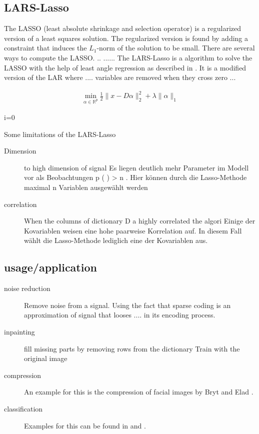 \subsection{LARS-Lasso}
\label{sec:lars}

The LASSO (least absolute shrinkage and selection operator) is a regularized version of a least squares solution.
The regularized version is found by adding a constraint that induces the $L_1$-norm of the solution to be small. \cite{Tibshirani1998}
There are several ways to compute the LASSO. .. ...... \cite{} 
The LARS-Lasso is a algorithm to solve the LASSO with the help of least angle regression
as described in \cite{Efron2004}. It is a modified version of the LAR where .... variables are removed when they cross zero ...


\begin{align}
\min_{\alpha\in\mathbb{R}^{p}}  \frac{1}{2} \lVert x - D\alpha \rVert^{2}_{2} + \lambda \lVert \alpha \rVert_{1}
\end{align}

\begin{algorithm}
\begin{algorithmic}
\STATE i=0
\end{algorithmic}
\end{algorithm}

Some limitations of the LARS-Lasso
\begin{description}
 \item[Dimension] to high dimension of signal 
Es liegen deutlich mehr Parameter im Modell vor als Beobachtungen  p ( ) > n . Hier 
können durch die Lasso-Methode maximal  n Variablen ausgewählt werden

\item[correlation] When the columns of dictionary D a highly correlated the algori
Einige der Kovariablen weisen eine hohe  paarweise Korrelation auf. In diesem Fall 
wählt die Lasso-Methode lediglich eine der Kovariablen aus.
\end{description}


\subsection{usage/application}
\begin{description}
\item[noise reduction]
Remove noise from a signal. Using the fact that sparse coding 
is an approximation of signal that looses .... in its encoding process. 
\cite{Elad2006}

\item[inpainting]
fill missing parts by removing rows from the dictionary
Train with the original image
\cite{mairal08sparse}

\item[compression] An example for this is the compression of facial images by Bryt and Elad \cite{Bryt2008}.
\item[classification] Examples for this can be found in \cite{Mairal2008b} and \cite{Bar2009}.
\end{description}



